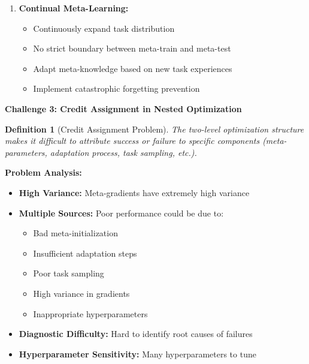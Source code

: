 \documentclass[12pt]{article}
\newcommand{\ieee}[1]{\textcolor{IEEEBlue}{\textbf{#1}}}
\newtheorem{definition}{Definition}
\begin{document}
{{\begin{enumerate}
				\textbf{Implementation:}
				\begin{itemize}
					\item Measure epistemic uncertainty in task embeddings
					\item Adapt exploration/exploitation based on uncertainty
					\item Use ensemble methods for uncertainty estimation
					\item Implement graceful degradation strategies
				\end{itemize}
				
				\item \textbf{Continual Meta-Learning:}
				
				\begin{itemize}
					\item Continuously expand task distribution
					\item No strict boundary between meta-train and meta-test
					\item Adapt meta-knowledge based on new task experiences
					\item Implement catastrophic forgetting prevention
				\end{itemize}
			\end{enumerate}
			
			\ieee{Challenge 3: Credit Assignment in Nested Optimization}
			
			\begin{definition}[Credit Assignment Problem]
			The two-level optimization structure makes it difficult to attribute success or failure to specific components (meta-parameters, adaptation process, task sampling, etc.).
			\end{definition}
			
			\textbf{Problem Analysis:}
			
			\begin{itemize}
				\item \textbf{High Variance:} Meta-gradients have extremely high variance
				\item \textbf{Multiple Sources:} Poor performance could be due to:
				\begin{itemize}
					\item Bad meta-initialization
					\item Insufficient adaptation steps
					\item Poor task sampling
					\item High variance in gradients
					\item Inappropriate hyperparameters
				\end{itemize}
				\item \textbf{Diagnostic Difficulty:} Hard to identify root causes of failures
				\item \textbf{Hyperparameter Sensitivity:} Many hyperparameters to tune
			\end{itemize}
			
}}
\end{document}
